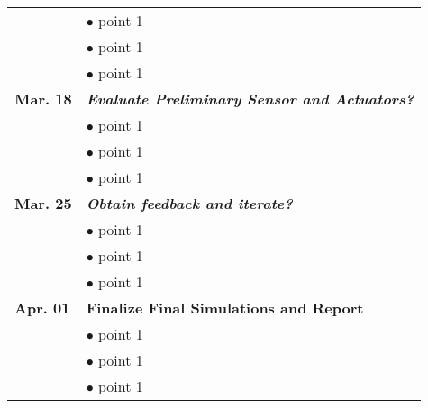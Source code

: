 \documentclass[12pt]{article}
\begin{document}
{\begin{tabular}{l | l}
 & $\bullet$ point 1\\
  & $\bullet$ point 1\\
   & $\bullet$ point 1\\
\textbf{Mar. 18} & \textbf{\textit{Evaluate Preliminary Sensor and Actuators?}}\\
 & $\bullet$ point 1\\
  & $\bullet$ point 1\\
   & $\bullet$ point 1\\
\textbf{Mar. 25} & \textbf{\textit{Obtain feedback and iterate?}}\\
 & $\bullet$ point 1\\
  & $\bullet$ point 1\\
   & $\bullet$ point 1\\
\textbf{Apr. 01} & \textbf{Finalize Final Simulations and Report}\\
 & $\bullet$ point 1\\
  & $\bullet$ point 1\\
   & $\bullet$ point 1\\


\end{tabular}
}
\end{document}
